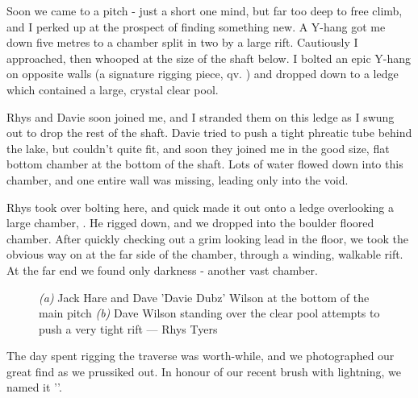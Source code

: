 Soon we came to a pitch - just a short one mind, but far too deep to free climb, and I perked up at the prospect of finding something new. A Y-hang got me down five metres to a chamber split in two by a large rift. Cautiously I approached, then whooped at the size of the shaft below. I bolted an epic Y-hang on opposite walls (a signature rigging piece, qv. ) and dropped down to a ledge which contained a large, crystal clear pool.

Rhys and Davie soon joined me, and I stranded them on this ledge as I swung out to drop the rest of the shaft. Davie tried to push a tight phreatic tube behind the lake, but couldn’t quite fit, and soon they joined me in the good size, flat bottom chamber at the bottom of the shaft. Lots of water flowed down into this chamber, and one entire wall was missing, leading only into the void.

Rhys took over bolting here, and quick made it out onto a ledge overlooking a large chamber, . He rigged down, and we dropped into the boulder floored chamber. After quickly checking out a grim looking lead in the floor, we took the obvious way on at the far side of the chamber, through a winding, walkable rift. At the far end we found only darkness - another vast chamber.


\begin{figure}[t!]
\checkoddpage \ifoddpage \forcerectofloat \else \forceversofloat \fi
\centering
\begin{subfigure}{0.667\textwidth}
        \caption{}
\end{subfigure}\hfill
\begin{subfigure}{0.31\textwidth}
 \caption{}\label{Crystal pool}
\end{subfigure}
\caption{\emph{(a)} Jack Hare and Dave 'Davie Dubz' Wilson at the bottom of the \protect{} main pitch \emph{(b)} Dave Wilson standing over the clear pool attempts to push a very tight rift --- Rhys Tyers}
\label{new figure}
\end{figure}

The day spent rigging the traverse was worth-while, and we photographed our great find as we prussiked out. In honour of our recent brush with lightning, we named it ''. 



